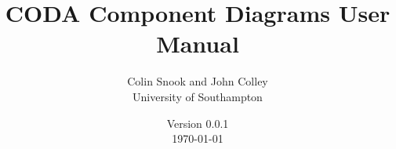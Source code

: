 \documentclass[a4paper,10pt]{article}
\title{CODA Component Diagrams User Manual}
\author{Colin Snook and John Colley\\University of Southampton}
\date{%
  Version 0.0.1\\%
  \today%
}
\begin{document}
\ifplastex%
\maketitle%
\else%
 \ifstandalone%
 \maketitle %
 \else%
 \fi%
\fi%












\end{document}

